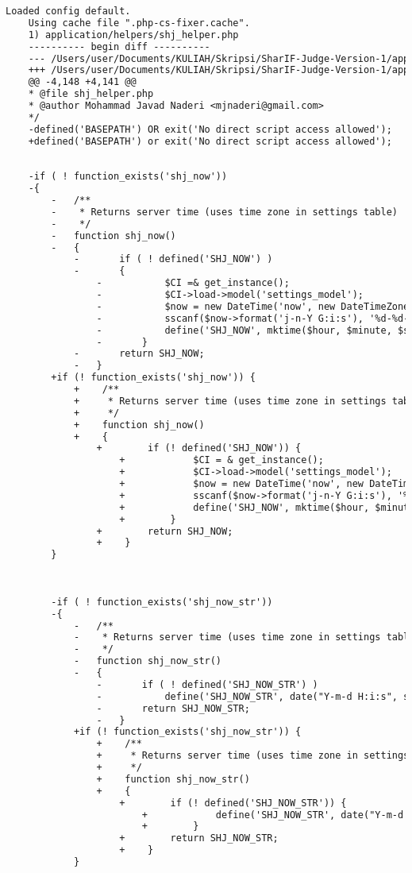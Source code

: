 \begin{lstlisting}[language=diff, caption=Perubahan pada kode shj\_helper.php]
	Loaded config default.
	Using cache file ".php-cs-fixer.cache".
	1) application/helpers/shj_helper.php
	---------- begin diff ----------
	--- /Users/user/Documents/KULIAH/Skripsi/SharIF-Judge-Version-1/application/helpers/shj_helper.php
	+++ /Users/user/Documents/KULIAH/Skripsi/SharIF-Judge-Version-1/application/helpers/shj_helper.php
	@@ -4,148 +4,141 @@
	* @file shj_helper.php
	* @author Mohammad Javad Naderi <mjnaderi@gmail.com>
	*/
	-defined('BASEPATH') OR exit('No direct script access allowed');
	+defined('BASEPATH') or exit('No direct script access allowed');
	
	
	-if ( ! function_exists('shj_now'))
	-{
		-	/**
		-	 * Returns server time (uses time zone in settings table)
		-	 */
		-	function shj_now()
		-	{
			-		if ( ! defined('SHJ_NOW') )
			-		{
				-			$CI =& get_instance();
				-			$CI->load->model('settings_model');
				-			$now = new DateTime('now', new DateTimeZone($CI->settings_model->get_setting('timezone')));
				-			sscanf($now->format('j-n-Y G:i:s'), '%d-%d-%d %d:%d:%d', $day, $month, $year, $hour, $minute, $second);
				-			define('SHJ_NOW', mktime($hour, $minute, $second, $month, $day, $year));
				-		}
			-		return SHJ_NOW;
			-	}
		+if (! function_exists('shj_now')) {
			+    /**
			+     * Returns server time (uses time zone in settings table)
			+     */
			+    function shj_now()
			+    {
				+        if (! defined('SHJ_NOW')) {
					+            $CI = & get_instance();
					+            $CI->load->model('settings_model');
					+            $now = new DateTime('now', new DateTimeZone($CI->settings_model->get_setting('timezone')));
					+            sscanf($now->format('j-n-Y G:i:s'), '%d-%d-%d %d:%d:%d', $day, $month, $year, $hour, $minute, $second);
					+            define('SHJ_NOW', mktime($hour, $minute, $second, $month, $day, $year));
					+        }
				+        return SHJ_NOW;
				+    }
		}
		
		
		
		-if ( ! function_exists('shj_now_str'))
		-{
			-	/**
			-	 * Returns server time (uses time zone in settings table)
			-	 */
			-	function shj_now_str()
			-	{
				-		if ( ! defined('SHJ_NOW_STR') )
				-			define('SHJ_NOW_STR', date("Y-m-d H:i:s", shj_now()));
				-		return SHJ_NOW_STR;
				-	}
			+if (! function_exists('shj_now_str')) {
				+    /**
				+     * Returns server time (uses time zone in settings table)
				+     */
				+    function shj_now_str()
				+    {
					+        if (! defined('SHJ_NOW_STR')) {
						+            define('SHJ_NOW_STR', date("Y-m-d H:i:s", shj_now()));
						+        }
					+        return SHJ_NOW_STR;
					+    }
			}
			

\end{lstlisting}
